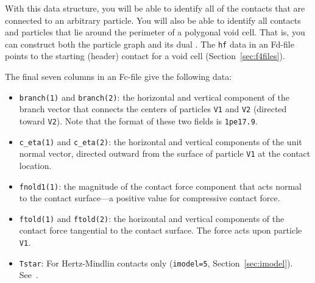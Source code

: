 \documentclass[letterpaper,11pt]{article}
\begin{document}
With this data structure, you will be able to identify all of
the contacts that are connected to an arbitrary particle.
You will also be able to identify all contacts
and particles that lie around the perimeter of
a polygonal void cell.
That is, you can construct both the particle graph and its dual
\cite{Satake:1992a}.
The \texttt{hf} data in an Fd-file points to the starting
(header) contact for a
void cell (Section~\ref{sec:f4files}).
\par
The final seven columns in an Fc-file give the following data:
\begin{itemize}
\item
\texttt{branch(1)} and \texttt{branch(2)}:
the horizontal and vertical component of the branch vector that
connects 
the centers of particles \texttt{V1} and \texttt{V2}
(directed toward \texttt{V2}).  Note that the format of these two
fields is \texttt{1pe17.9}.
\item
\texttt{c\_eta(1)} and \texttt{c\_eta(2)}:
the horizontal and vertical components of the unit normal vector, directed
outward from the surface of particle \texttt{V1}
at the contact location.
\item
\texttt{fnold1(1)}:
the magnitude of the 
contact force component that acts normal to the contact surface---a
positive value for compressive contact force.
\item
\texttt{ftold(1)} and \texttt{ftold(2)}:
the horizontal and vertical components of the contact force
tangential to the contact surface.
The force acts upon particle \texttt{V1}.
\item
\texttt{Tstar}:
For Hertz-Mindlin contacts only (\texttt{imodel=5}, 
Section~\ref{sec:imodel}). See~\cite{Thornton:1988a}.
\end{itemize}
%
\end{document}
